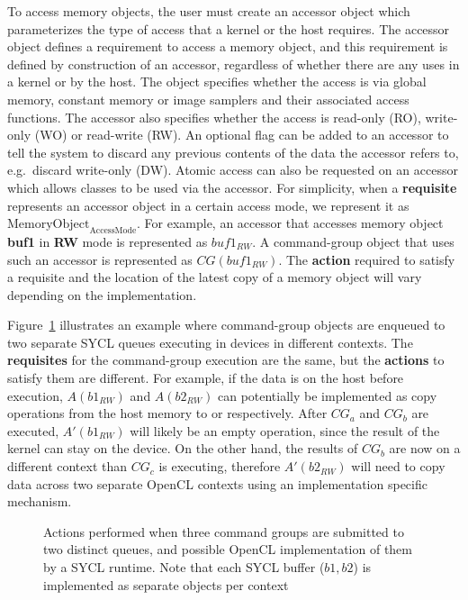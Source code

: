 To access memory objects, the user must create an
\gls{accessor} object which parameterizes the type of access
that a kernel or the host requires.
The \gls{accessor} object defines a requirement to access a memory
object, and this requirement is defined by
construction of an accessor, regardless of whether there are any uses in a kernel or by the host.
The  object specifies
whether the access is via global memory, constant memory or image samplers and
their associated access functions. The \gls{accessor} also specifies whether the
access is read-only (RO), write-only (WO) or read-write (RW). 
An optional 
flag can be added to an accessor to tell the system to discard any previous
contents of the data the accessor refers to, e.g.\ discard write-only (DW). 
Atomic access can also be requested
on an accessor which allows  classes to be used via
the accessor.
For simplicity, when a \textbf{requisite} represents an accessor object  in 
a certain access mode, we represent it as 
$\text{MemoryObject}_{\text{AccessMode}}$.
For example, an accessor that accesses memory object \textbf{buf1} in \textbf{RW} 
mode is represented as $buf1_{RW}$.
A \gls{command-group} object that uses such an accessor is represented 
as $CG(buf1_{RW})$.
The \textbf{action} required to satisfy
a requisite and the location 
of the latest copy of a memory object will vary depending on the implementation.

Figure~\ref{fig:devicetodevice} 
illustrates an example where \gls{command-group}
objects are enqueued to two separate SYCL queues executing in devices in
different contexts.
The \textbf{requisites} for the \gls{command-group} execution are 
the same, but the \textbf{actions} to satisfy them are different.
For example, if the data is on the host before execution, 
$A(b1_{RW})$ and $A(b2_{RW})$ can potentially be implemented as copy 
operations from the host memory to  or 
respectively.
After $CG_a$ and $CG_b$ are executed, $A'(b1_{RW})$ will likely
be an empty operation, since the result of the kernel can stay on the device.
On the other hand, the results of $CG_b$ are now on a different
context than $CG_c$ is executing, therefore $A'(b2_{RW})$ will need to 
copy data across two separate OpenCL contexts using an implementation 
specific mechanism.

\begin{figure}[h]
\centering

\caption{Actions performed when three command groups are submitted 
to two distinct queues, and possible OpenCL implementation of them by
  a SYCL runtime. Note that each SYCL buffer ($b1,b2$) is implemented as
  separate  objects per context}
\label{fig:devicetodevice}
\end{figure}

